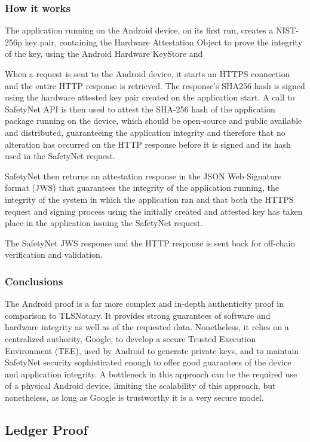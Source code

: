 \subsubsection{How it works}
The application running on the Android device, on its first run, creates a NIST-256p key pair, containing the Hardware Attestation Object to prove the integrity of the key, using the Android Hardware KeyStore and

When a request is sent to the Android device, it starts an HTTPS connection and the entire HTTP response is retrieved. The response's SHA256 hash is signed using the hardware attested key pair created on the application start. A call to SafetyNet API is then used to attest the SHA-256 hash of the application package running on the device, which should be open-source and public available and distributed, guaranteeing the application integrity and therefore that no alteration has occurred on the HTTP response before it is signed and its hash used in the SafetyNet request.

SafetyNet then returns an attestation response in the JSON Web Signature format (JWS) that guarantees the integrity of the application running, the integrity of the system in which the application ran and that both the HTTPS request and signing process using the initially created and attested key has taken place in the application issuing the SafetyNet request.

The SafetyNet JWS response and the HTTP response is sent back for off-chain verification and validation.

\subsubsection{Conclusions}
The Android proof is a far more complex and in-depth authenticity proof in comparison to TLSNotary. It provides strong guarantees of software and hardware integrity as well as of the requested data. Nonetheless, it relies on a centralized authority, Google, to develop a secure Trusted Execution Environment (TEE), used by Android to generate private keys, and to maintain SafetyNet security sophisticated enough to offer good guarantees of the device and application integrity. A bottleneck in this approach can be the required use of a physical Android device, limiting the scalability of this approach, but nonetheless, as long as Google is trustworthy it is a very secure model.

\subsection{Ledger Proof}


